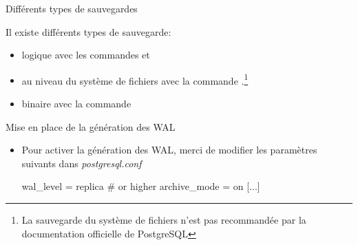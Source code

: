 \begin{frame}[fragile]{Différents types de sauvegardes}

Il existe différents types de sauvegarde:

\begin{itemize}

   \item logique avec les commandes  et 
   \item au niveau du système de fichiers avec la commande .\footnote{La sauvegarde du système de fichiers n'est pas recommandée par la documentation officielle de PostgreSQL}
   \item binaire avec la commande 

\end{itemize}

\begin{toile}
\end{toile}

\end{frame}


\begin{frame}[fragile]{Mise en place de la génération des WAL}

\begin{itemize}

   \item Pour activer la génération des WAL, merci de modifier les paramètres suivants dans \textit{postgresql.conf}

\begin{intercom}
wal\_level = replica # or higher
archive\_mode = on
[...]
\end{intercom}

\end{itemize}

\begin{toile}
\end{toile}

\end{frame}


